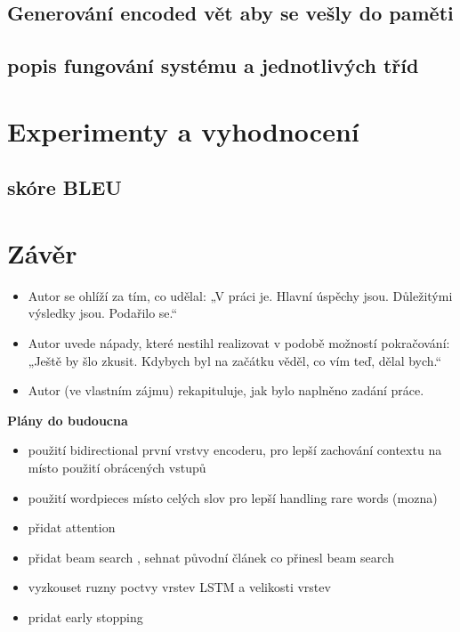 \section{Generování encoded vět aby se vešly do paměti}

\section{popis fungování systému a jednotlivých tříd}

\chapter{Experimenty a vyhodnocení}
\section{skóre BLEU}



\chapter{Závěr}
\begin{itemize}
  \item Autor se ohlíží za tím, co udělal: „V práci je. Hlavní úspěchy jsou. Důležitými výsledky jsou. Podařilo se.“
  \item Autor uvede nápady, které nestihl realizovat v podobě možností pokračování: „Ještě by šlo zkusit. Kdybych byl na začátku věděl, co vím teď, dělal bych.“
  \item Autor (ve vlastním zájmu) rekapituluje, jak bylo naplněno zadání práce.
\end{itemize}

\textbf{Plány do budoucna}
\begin{itemize}
    \item použití bidirectional první vrstvy encoderu, pro lepší zachování contextu \cite{googleBridgingGap} na místo použití obrácených vstupů
    \item použití wordpieces \cite{googleBridgingGap} místo celých slov pro lepší handling rare words (mozna)
    \item přidat attention \cite{attention}
    \item přidat beam search \cite{nmtTutorial}, sehnat původní článek co přinesl beam search
    \item vyzkouset ruzny poctvy vrstev LSTM a velikosti vrstev
    \item pridat early stopping
\end{itemize}
